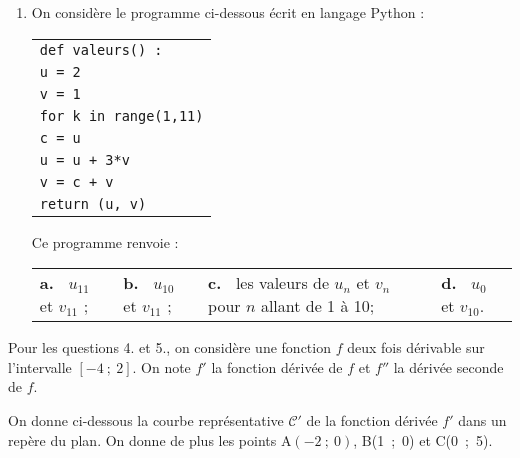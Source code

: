 \documentclass[11pt]{article}
\begin{document}
\begin{enumerate}
\item On considère le programme ci-dessous écrit en langage Python :

\begin{center}
\begin{tabular}{|>{\texttt}l|}\hline
\texttt{def valeurs() :}\\
\quad \texttt{u = 2}\\
\quad \texttt{v = 1}\\
\quad \texttt{for k in range(1,11)}\\
\quad \quad \texttt{c = u}\\
\quad \quad \texttt{u = u + 3*v}\\
\quad \quad \texttt{v = c + v}\\
\quad \texttt{return (u, v)}\\ \hline
\end{tabular}
\end{center}

Ce programme renvoie :

\begin{center}
\begin{tabularx}{\linewidth}{*{4}{X}}
\textbf{a.~} $u_{11}$ et $v_{11}$ ;&
\textbf{b.~} $u_{10}$ et $v_{11}$ ;&
\textbf{c.~} les valeurs de $u_n$ et $v_n$ pour $n$ allant de 1 à 10;&
\textbf{d.~} $u_{0 }$ et $v_{10}$.
\end{tabularx}
\end{center}
\end{enumerate}

Pour les questions 4. et 5., on considère une fonction $f$ deux fois dérivable sur l'intervalle
$[-4~;~2]$. On note $f'$ la fonction dérivée de $f$ et $f''$  la dérivée seconde de $f$.

On donne ci-dessous la courbe représentative $\mathcal{C}'$ de la fonction dérivée $f'$ dans un repère du plan. On donne de plus les points A$(-2~;~0)$, B(1~;~0) et C(0~;~5).
\end{document}
